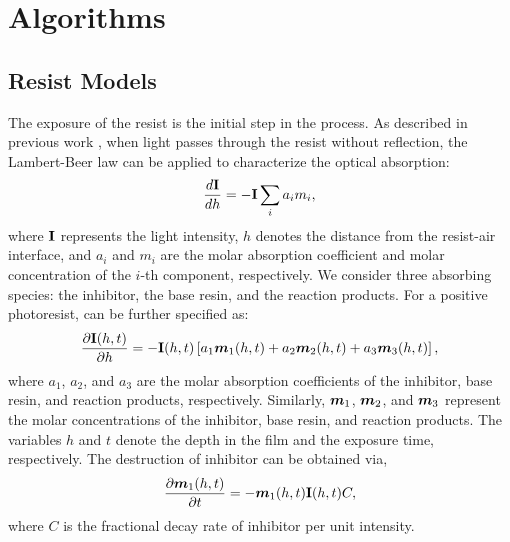 \section{Algorithms}

\subsection{Resist Models}

 The exposure of the resist is the initial step in the process. As described in previous work \cite{dill1975characterization}, when light passes through the resist without reflection, the Lambert-Beer law can be applied to characterize the optical absorption:
\begin{equation}
    \frac{d{\mathbf{I}}}{dh} = -{\mathbf{I}} \sum_i a_i m_i,
    \label{eq:LBL}
\end{equation}
where ${\mathbf{I}}$ represents the light intensity, $h$ denotes the distance from the resist-air interface, and $a_i$ and $m_i$ are the molar absorption coefficient and molar concentration of the $i$-th component, respectively. We consider three absorbing species: the inhibitor, the base resin, and the reaction products. For a positive photoresist,  can be further specified as:
\begin{equation}
    \frac{\partial {\mathbf{I}}(h,t)}{\partial h} = -{\mathbf{I}}(h,t) \left[a_1 {\bm{m}}_1(h,t) + a_2 {\bm{m}}_2(h,t) + a_3 {\bm{m}}_3(h,t)\right],
    \label{eq:depth}
\end{equation}
where $a_1$, $a_2$, and $a_3$ are the molar absorption coefficients of the inhibitor, base resin, and reaction products, respectively. Similarly, ${\bm{m}}_1$, ${\bm{m}}_2$, and ${\bm{m}}_3$ represent the molar concentrations of the inhibitor, base resin, and reaction products. The variables $h$ and $t$ denote the depth in the film and the exposure time, respectively.
 The destruction of inhibitor can be obtained via,
\begin{equation}
    \frac{\partial {\bm{m}}_1(h,t)}{\partial t} = - {\bm{m}}_1(h,t){\mathbf{I}}(h,t)C,\label{eq:time}
\end{equation}
where $C$ is the fractional decay rate of inhibitor per unit intensity.

